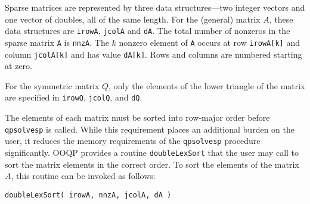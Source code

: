Sparse matrices are represented by three data structures---two integer
vectors and one vector of doubles, all of the same length. For the
(general) matrix $A$, these data structures are \texttt{irowA},
\texttt{jcolA} and \texttt{dA}. The total number of nonzeros in the
sparse matrix \texttt{A} is \texttt{nnzA}. The $k$ nonzero
element of \texttt{A} occurs at row \texttt{irowA[k]} and column
\texttt{jcolA[k]} and has value \texttt{dA[k]}. Rows and columns are
numbered starting at zero.

For the symmetric matrix $Q$, only the elements of the lower triangle
of the matrix are specified in \texttt{irowQ}, \texttt{jcolQ}, and
\texttt{dQ}.

The elements of each matrix must be sorted into row-major order before
\texttt{qpsolvesp} is called.  While this requirement places an
additional burden on the user, it reduces the memory requirements of
the \texttt{qpsolvesp} procedure significantly. OOQP provides a
routine \texttt{doubleLexSort} that the user may call to sort the
matrix elements in the correct order. To sort the elements of the
matrix $A$, this routine can be invoked as follows:
\begin{verbatim}
doubleLexSort( irowA, nnzA, jcolA, dA )
\end{verbatim}

